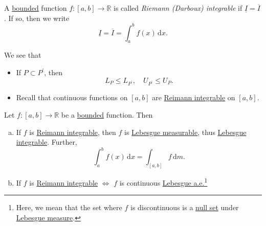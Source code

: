 \begin{definition}\label{def:Riemann-integrable}
	A \underline{bounded} function \(f\colon [a, b]\to \mathbb{R} \) is called \emph{Riemann (Darboux) integrable}
	if \(\underline{I} = \overline{I}\). If so, then we write
	\[
		\underline{I} = \overline{I} = \int_{a}^{b} f(x) \,\mathrm{d}x.
	\]
\end{definition}
\begin{note}
	We see that
	\begin{itemize}
		\item If \(P\subset P ^\prime \), then
		      \[
			      L_{P}\leq L_{P ^\prime },\quad U_{P ^\prime }\leq U_{P}.
		      \]
		\item Recall that continuous functions on \([a, b]\) are \hyperref[def:Riemann-integrable]{Reimann integrable} on \([a, b]\).
	\end{itemize}
\end{note}
\begin{theorem}
	Let \(f\colon [a, b]\to \mathbb{R} \) be a \underline{bounded} function. Then
	\begin{enumerate}[(a)]
		\item If \(f\) is \hyperref[def:Riemann-integrable]{Reimann integrable}, then \(f\) is \hyperref[def:measurable-function]{Lebesgue measurable}, thus
		      \hyperref[def:integrable]{Lebesgue integrable}. Further,
		      \[
			      \int_{a}^{b} f(x) \,\mathrm{d}x = \int_{[a, b]}f \,\mathrm{d}m.
		      \]
		\item If \(f\) is \hyperref[def:Riemann-integrable]{Reimann integrable} \(\iff \) \(f\) is continuous \underline{\hyperref[def:Lebesgue-measure]{Lebesgue} \hyperref[def:mu-almost-everywhere]{a.e.}}\footnote{Here, we
			      mean that the set where \(f\) is discontinuous is a \hyperref[def:mu-null-set]{null set} under \hyperref[def:Lebesgue-measure]{Lebesgue measure}.}
	\end{enumerate}
\end{theorem}
